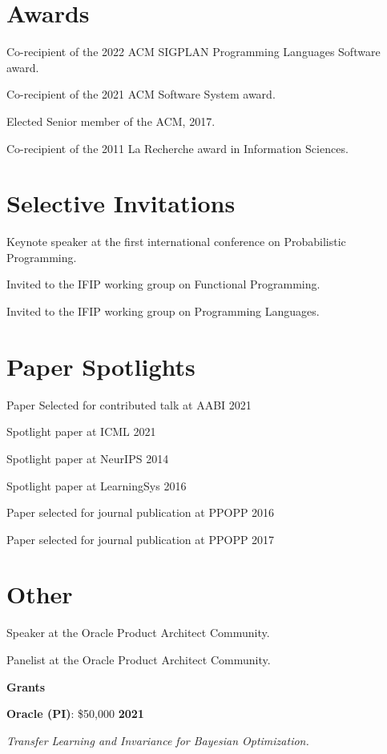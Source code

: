 \documentclass[margin,line]{res}
\begin{document}
\begin{resume}
\section{\sc Awards}

Co-recipient of the 2022 ACM SIGPLAN Programming Languages Software award.

Co-recipient of the 2021 ACM Software System award.

Elected Senior member of the ACM, 2017.

Co-recipient of the 2011 La Recherche award in Information Sciences.

\section{\sc Selective Invitations}

Keynote speaker at the first international conference on Probabilistic Programming. 

Invited to the IFIP working group on Functional Programming.

Invited to the IFIP working group on Programming Languages.

\section{\sc Paper Spotlights}

Paper Selected for contributed talk at AABI 2021

Spotlight paper at ICML 2021

Spotlight paper at NeurIPS 2014

Spotlight paper at LearningSys 2016

Paper selected for journal publication at PPOPP 2016

Paper selected for journal publication at PPOPP 2017

\section{\sc Other}

Speaker at the Oracle Product Architect Community.

Panelist at the Oracle Product Architect Community.

\newpage
{\bf {\Large Grants}}

{\bf Oracle (PI)}: \$50,000 \hfill {\bf 2021}
\vspace{-.4cm}

{\em Transfer Learning and Invariance for Bayesian Optimization.} \\


\end{resume}
\end{document}
